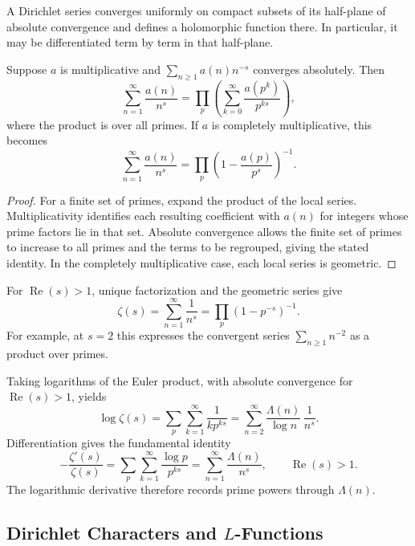 \begin{theorem}
A Dirichlet series converges uniformly on compact subsets of its half-plane of absolute convergence and defines a holomorphic function there. In particular, it may be differentiated term by term in that half-plane.
\end{theorem}

\begin{theorem}
Suppose $a$ is multiplicative and $\sum_{n\geq1}a(n)n^{-s}$ converges absolutely. Then
\[
 \sum_{n=1}^{\infty}\frac{a(n)}{n^s}
 =\prod_{p}\left(\sum_{k=0}^{\infty}\frac{a(p^k)}{p^{ks}}\right),
\]
where the product is over all primes. If $a$ is completely multiplicative, this becomes
\[
 \sum_{n=1}^{\infty}\frac{a(n)}{n^s}
 =\prod_p\left(1-\frac{a(p)}{p^s}\right)^{-1}.
\]
\end{theorem}

\begin{proof}
For a finite set of primes, expand the product of the local series. Multiplicativity identifies each resulting coefficient with $a(n)$ for integers whose prime factors lie in that set. Absolute convergence allows the finite set of primes to increase to all primes and the terms to be regrouped, giving the stated identity. In the completely multiplicative case, each local series is geometric.
\end{proof}

\begin{example}
For $\operatorname{Re}(s)>1$, unique factorization and the geometric series give
\[
 \zeta(s)=\sum_{n=1}^{\infty}\frac{1}{n^s}
 =\prod_p\left(1-p^{-s}\right)^{-1}.
\]
For example, at $s=2$ this expresses the convergent series $\sum_{n\geq1}n^{-2}$ as a product over primes.
\end{example}

Taking logarithms of the Euler product, with absolute convergence for $\operatorname{Re}(s)>1$, yields
\[
 \log\zeta(s)=\sum_p\sum_{k=1}^{\infty}\frac{1}{k p^{ks}}
 =\sum_{n=2}^{\infty}\frac{\Lambda(n)}{\log n}\,\frac{1}{n^s}.
\]
Differentiation gives the fundamental identity
\[
 -\frac{\zeta'(s)}{\zeta(s)}
 =\sum_{p}\sum_{k=1}^{\infty}\frac{\log p}{p^{ks}}
 =\sum_{n=1}^{\infty}\frac{\Lambda(n)}{n^s},
 \qquad \operatorname{Re}(s)>1.
\]
The logarithmic derivative therefore records prime powers through $\Lambda(n)$.

\subsection{Dirichlet Characters and \texorpdfstring{$L$}{L}-Functions}

